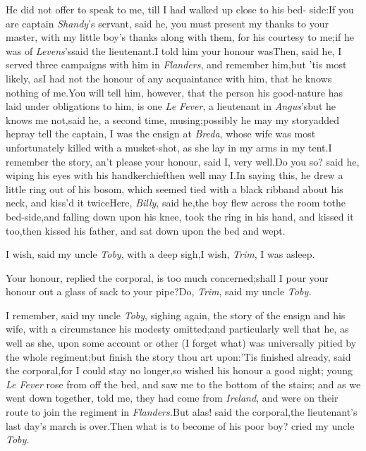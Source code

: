 \documentclass{article}
\begin{document}
He did not offer to speak to me, till I had walked up close to
his bed- side:\tsk If you are captain \textit{Shandy}’s
servant, said he, you must present my thanks to your master, with
my little boy’s thanks along with them, for his courtesy to
me;\tsk if he was of \textit{Levens}’s\tsk said the
lieutenant.\tsk I told him your honour was\tsk Then, said he, I
served three campaigns with him in \textit{Flanders}, and remember
him,\tsk but ’tis most likely, as\pb I had not the honour of
any acquaintance with him, that he knows nothing of me.\tsh You will tell him, however, that
the person his good-nature has laid under obligations to him, is
one \textit{Le Fever}, a lieutenant in
\textit{Angus}’s\tsh but he knows me not,\tsk said
he, a second time, musing;\tsh possibly he may my
story\tsk added he\tsk pray tell the captain, I was the ensign
at \textit{Breda}, whose wife was most unfortunately killed with a
musket-shot, as she lay in my arms in my tent.\tsh I
remember the story, an’t please your honour, said I, very
well.\tsh Do you so? said he, wiping his eyes with his
handkerchief\tsk then well may I.\tsk In saying this, he drew a
little ring out of his bosom, which seemed tied with a black
ribband about his neck, and kiss’d it
twice\tsh Here, \textit{Billy}, said he,\tsk the boy flew
across the room to\pb the bed-side,\tsk and falling down upon his
knee, took the ring in his hand, and kissed it too,\tsk then
kissed his father, and sat down upon the bed and wept.

I wish, said my uncle \textit{Toby}, with a deep sigh,\tsk I
wish, \textit{Trim}, I was asleep.

Your honour, replied the corporal, is too much
concerned;\tsk shall I pour your honour out a glass of sack to
your pipe?\tsh Do, \textit{Trim}, said my uncle
\textit{Toby.}

I remember, said my uncle \textit{Toby}, sighing again, the story
of the ensign and his wife, with a circumstance his modesty
omitted;\tsk and particularly well that he, as well as she, upon
some account or other (I forget what) was universally pitied by the
whole regiment;\pb\tsk but finish the story thou art
upon:\break\tsk ’Tis finished already, said the
corporal,\tsk for I could stay no longer,\tsk so wished his
honour a good night; young \textit{Le Fever} rose from off the bed,
and saw me to the bottom of the stairs; and as we went down
together, told me, they had come from \textit{Ireland}, and were on
their route to join the regiment in
\textit{Flanders.}\tsh But alas! said the
corporal,\tsk the lieutenant’s last day’s march is
over.\tsk Then what is to become of his poor boy? cried my uncle
\textit{Toby.}
\end{document}
